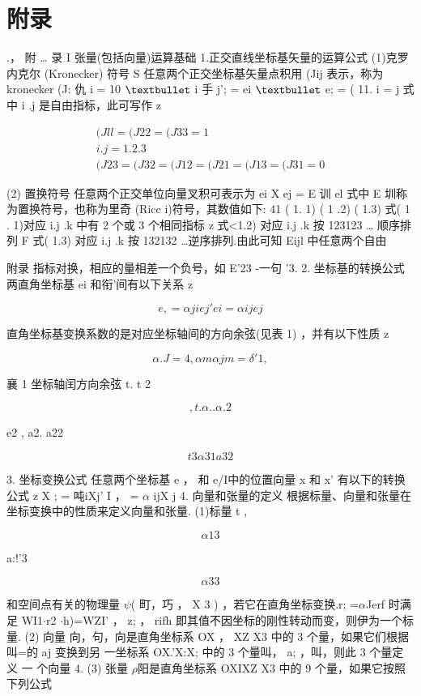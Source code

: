 \chapter{附录}
.， 附 … 录 I 张量(包括向量)运算基础 1.正交直线坐标基矢量的运算公式 (1)克罗内克尔 (Kronecker) 符号 S 任意两个正交坐标基矢量点积用 (Jij 表示，称为 kronecker (J: 仇 i = 10 ${\rm •}$ i 手 j'; = ei ${\rm •}$ e; = ( 11. i = j 式中 i .j 是自由指标，此可写作 z

\begin{gather*}
(Jll = (J22 = (J33 = 1\\
i.j = 1.2.3\\
(J23 = (J32 = (J12 = (J21 = (J13 = (J31 = 0
\end{gather*}

(2) 置换符号 任意两个正交单位向量叉积可表示为 ei X ej = E 训 el 式中 E 圳称为置换符号，也称为里奇 (Ricc i)符号，其数值如下: 41 ( 1. 1) ( 1 .2) ( 1.3) 式( 1 . 1)对应 i.j .k 中有 2 个或 3 个相同指标 z 式<1.2) 对应 i.j .k 按 123123 … 顺序排列 F 式( 1.3) 对应 i.j .k 按 132132 …逆序排列.由此可知 Eijl 中任意两个自由

附录 指标对换，相应的量相差一个负号，如 E'23 -一句 '3. 2. 坐标基的转换公式 两直角坐标基 ei 和衔'间有以下关系 z

\[e , = \alpha jie j' e i = \alpha ijej\]

直角坐标基变换系数的是对应坐标轴间的方向余弦(见表 1) ，并有以下性质 z

\[\alpha .J=4 ,  \alpha m\alpha  jm = \delta '1 , \]

襄 1 坐标轴闰方向余弦 t. t 2

\[, t. \alpha  . . \alpha .2\]

e2 , a2. a22

\[t3 \alpha 31 a32\]

3. 坐标变换公式 任意两个坐标基 e ， 和 e/I中的位置向量 x 和 x' 有以下的转换公式 z X ; = 吨iXj' I ， = $\alpha$ ijX j 4. 向量和张量的定义 根据标量、向量和张量在坐标变换中的性质来定义向量和张量. (1)标量 t ,

\[\alpha 13\]

a:!'3

\[\alpha 33\]

和空间点有关的物理量 $\psi$( 町，巧 ， X 3 ) ，若它在直角坐标变换.r; =$\alpha$Jerf 时满足 WI1$\cdot $r2 $\cdot $h)=WZI' ， z; ， rifh 即其值不因坐标的刚性转动而变，则伊为一个标量. (2) 向量 向，句，向是直角坐标系 OX ， XZ X3 中的 3 个量，如果它们根据叫=的 aj 变换到另 一坐标系 OX.'X:X; 中的 3 个量叫， a; ，叫，则此 3 个量定义 一 个向量 4. (3) 张量 $\rho$阳是直角坐标系 OXIXZ X3 中的 9 个量，如果它按照下列公式

